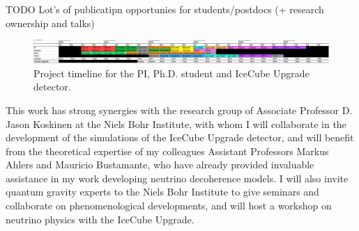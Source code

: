 \documentclass[a4paper,11pt]{article}
\begin{document}
TODO Lot's of publicatipn opportunies for students/postdocs (+ research ownership and talks) \\


\begin{figure}[h]
	\includegraphics[width=0.99\linewidth]{images/timeline.png}
	\caption{Project timeline for the PI, Ph.D. student and IceCube Upgrade detector.}
	\label{fig:timeline}
\end{figure}

This work has strong synergies with the research group of Associate Professor D. Jason Koskinen at the Niels Bohr Institute, with whom I will collaborate in the development of the simulations of the IceCube Upgrade detector, and will benefit from the theoretical expertise of my colleagues Assistant Professors Markus Ahlers and Mauricio Bustamante, who have already provided invaluable assistance in my work developing neutrino decoherence models. I will also invite quantum gravity experts to the Niels Bohr Institute to give seminars and collaborate on phenomenological developments, and will host a workshop on neutrino physics with the IceCube Upgrade.



\end{document}
